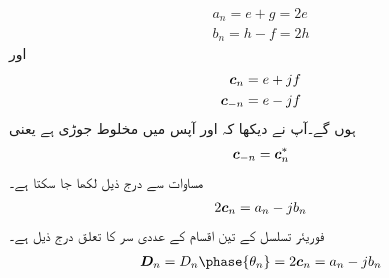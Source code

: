 \begin{align*}
a_n=e+g=2e\\
b_n=h-f=2h
\end{align*}
اور
\begin{align*}
{\ensuremath{{\boldsymbol{c}}}}_n&=e+jf\\
{{\boldsymbol{c}}}_{-n}&=e-jf
\end{align*}
ہوں گے۔آپ نے دیکھا کہ  اور  آپس میں مخلوط جوڑی ہے یعنی
\begin{align}
{\ensuremath{{\boldsymbol{c}}}}_{-n}={{\boldsymbol{c}}}^*_n
\end{align}
مساوات  سے درج ذیل لکھا جا سکتا ہے۔
\begin{align}
2{{\boldsymbol{c}}}_n=a_n-jb_n
\end{align}
فوریئر تسلسل کے تین اقسام کے عددی سر کا تعلق درج ذیل ہے۔
\begin{align}
\kx{D}_n=D_n\phase{\theta_n}=2\kx{c}_n=a_n-jb_n
\end{align}

